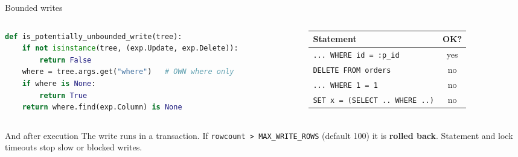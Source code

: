 \documentclass[aspectratio=169,10pt]{beamer}
\begin{document}
\begin{frame}[fragile]{Bounded writes}
  \begin{columns}[T]
    \begin{column}{0.52\textwidth}
\begin{lstlisting}[language=Python]
def is_potentially_unbounded_write(tree):
    if not isinstance(tree, (exp.Update, exp.Delete)):
        return False
    where = tree.args.get("where")   # OWN where only
    if where is None:
        return True
    return where.find(exp.Column) is None
\end{lstlisting}
    \end{column}
    \begin{column}{0.46\textwidth}
      \footnotesize
      \begin{tabular}{@{}lc@{}}
        \toprule
        \textbf{Statement} & \textbf{OK?} \\
        \midrule
        \texttt{... WHERE id = :p\_id}        & \textcolor{panelgreen}{yes} \\
        \texttt{DELETE FROM orders}           & \textcolor{panelred}{no} \\
        \texttt{... WHERE 1 = 1}              & \textcolor{panelred}{no} \\
        \texttt{SET x = (SELECT .. WHERE ..)} & \textcolor{panelred}{no} \\
        \bottomrule
      \end{tabular}
    \end{column}
  \end{columns}

  \vspace{8pt}
  \begin{block}{And after execution}
    \footnotesize
    The write runs in a transaction. If \texttt{rowcount > MAX\_WRITE\_ROWS} (default 100)
    it is \textbf{rolled back}. Statement and lock timeouts stop slow or blocked writes.
  \end{block}
\end{frame}
\end{document}

